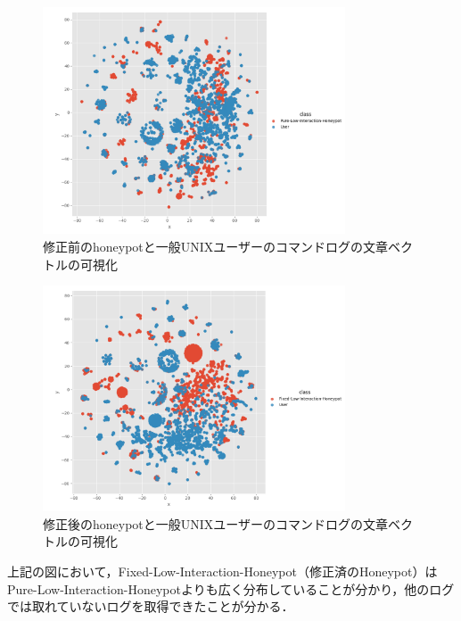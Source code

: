 \vspace{1mm}
\begin{figure}[htbp]
    \centering
    \includegraphics[width=0.8\textwidth]{figures/suuser.png}
    \caption{修正前のhoneypotと一般UNIXユーザーのコマンドログの文章ベクトルの可視化}
    \label{fig:tsne2}
\end{figure}
\vspace{3mm}

\vspace{3mm}
\begin{figure}[htbp]
    \centering
    \includegraphics[width=0.8\textwidth]{figures/fixuser.png}
    \caption{修正後のhoneypotと一般UNIXユーザーのコマンドログの文章ベクトルの可視化}
    \label{fig:tsne3}
\end{figure}
\vspace{1mm}
\clearpage

上記の図において，Fixed-Low-Interaction-Honeypot（修正済のHoneypot）はPure-Low-Interaction-Honeypotよりも広く分布していることが分かり，他のログでは取れていないログを取得できたことが分かる．


